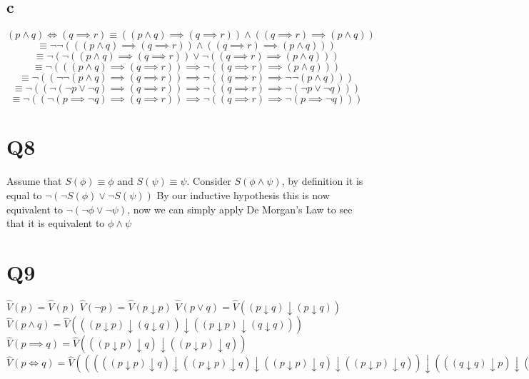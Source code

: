 \documentclass[12pt]{article}
\begin{document}
\subsection{c}
$(p \land q) \iff (q \implies r) \equiv ((p \land q) \implies (q \implies r)) \land ((q \implies r) \implies (p \land q)) $
\newline
$$\equiv \neg \neg (((p \land q) \implies (q \implies r)) \land ((q \implies r) \implies (p \land q)))$$
$$\equiv \neg (\neg((p \land q) \implies (q \implies r)) \lor \neg((q \implies r) \implies (p \land q)))$$
$$\equiv \neg (((p \land q) \implies (q \implies r)) \implies \neg((q \implies r) \implies (p \land q)))$$
$$\equiv \neg ((\neg \neg(p \land q) \implies (q \implies r)) \implies \neg((q \implies r) \implies \neg \neg(p \land q)))$$
$$\equiv \neg ((\neg (\neg p \lor \neg q) \implies (q \implies r)) \implies \neg((q \implies r) \implies \neg (\neg p \lor \neg q)))$$
$$\equiv \neg ((\neg (p \implies \neg q) \implies (q \implies r)) \implies \neg((q \implies r) \implies \neg (p \implies \neg q)))$$


\section{Q8}
Assume that $S(\phi) \equiv \phi$ and $S(\psi) \equiv \psi$. Consider $S(\phi \land \psi)$, 
by definition it is equal to $\neg (\neg S(\phi) \lor \neg S(\psi) )$
\newline
By our inductive hypothesis this is now equivalent to $\neg (\neg \phi \lor \neg \psi )$, now we 
can simply apply De Morgan's Law to see that it is equivalent to $\phi \land \psi$


\section{Q9}
$\hat{V}(p) = \hat{V}(p)$
\newline
$\hat{V}(\neg p) = \hat{V}(p \downarrow p) $
\newline
$\hat{V}(p \lor q) = \hat{V}((p \downarrow q) \downarrow(p \downarrow q)) $
\newline
$\hat{V}(p \land q) = \hat{V}(((p \downarrow p) \downarrow(q \downarrow q)) 
\downarrow ((p \downarrow p) \downarrow(q \downarrow q))) $
\newline
$\hat{V}(p \implies q) = 
\hat{V}(((p \downarrow p)\downarrow q) \downarrow((p \downarrow p) \downarrow q)) $
\newline
$\hat{V}(p \iff q) = 
\hat{V}(((((p \downarrow p)\downarrow q) \downarrow((p \downarrow p) \downarrow q)\downarrow ((p \downarrow p)\downarrow q) \downarrow((p \downarrow p) \downarrow q))
 \downarrow(((q \downarrow q)\downarrow p) \downarrow((q \downarrow q) \downarrow p) \downarrow ((q \downarrow q)\downarrow p) \downarrow((q \downarrow q) \downarrow p))) 
\downarrow ((((p \downarrow p)\downarrow q) \downarrow((p \downarrow p) \downarrow q) \downarrow ((p \downarrow p)\downarrow q) \downarrow((p \downarrow p) \downarrow q))
 \downarrow(((q \downarrow q)\downarrow p) \downarrow((q \downarrow q) \downarrow p) \downarrow ((q \downarrow q)\downarrow p) \downarrow((q \downarrow q) \downarrow p))))$
\end{document}
